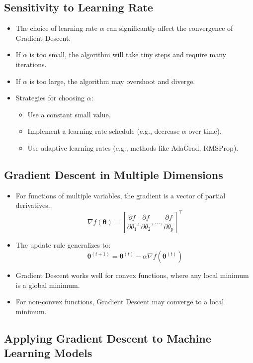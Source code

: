 \documentclass{article}
\begin{document}
\subsection{Sensitivity to Learning Rate}

\begin{itemize}
    \item The choice of learning rate $\alpha$ can significantly affect the convergence of Gradient Descent.
    \item If $\alpha$ is too small, the algorithm will take tiny steps and require many iterations.
    \item If $\alpha$ is too large, the algorithm may overshoot and diverge.
    \item Strategies for choosing $\alpha$:
    \begin{itemize}
        \item Use a constant small value.
        \item Implement a learning rate schedule (e.g., decrease $\alpha$ over time).
        \item Use adaptive learning rates (e.g., methods like AdaGrad, RMSProp).
    \end{itemize}
\end{itemize}

\subsection{Gradient Descent in Multiple Dimensions}

\begin{itemize}
    \item For functions of multiple variables, the gradient is a vector of partial derivatives.
    \[
    \nabla f(\boldsymbol{\theta}) = \left[ \frac{\partial f}{\partial \theta_1}, \frac{\partial f}{\partial \theta_2}, \dots, \frac{\partial f}{\partial \theta_p} \right]^\top
    \]
    \item The update rule generalizes to:
    \[
    \boldsymbol{\theta}^{(t+1)} = \boldsymbol{\theta}^{(t)} - \alpha \nabla f(\boldsymbol{\theta}^{(t)})
    \]
    \item Gradient Descent works well for convex functions, where any local minimum is a global minimum.
    \item For non-convex functions, Gradient Descent may converge to a local minimum.
\end{itemize}

\subsection{Applying Gradient Descent to Machine Learning Models}
\end{document}
